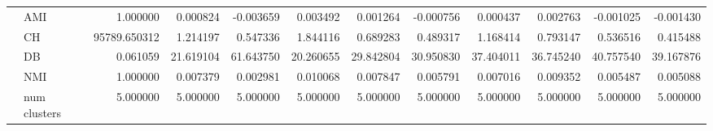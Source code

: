 \begin{tabular}{llrrrrrrrrrr}
 & AMI & 1.000000 & 0.000824 & -0.003659 & 0.003492 & 0.001264 & -0.000756 & 0.000437 & 0.002763 & -0.001025 & -0.001430 \\
 & CH & 95789.650312 & 1.214197 & 0.547336 & 1.844116 & 0.689283 & 0.489317 & 1.168414 & 0.793147 & 0.536516 & 0.415488 \\
 & DB & 0.061059 & 21.619104 & 61.643750 & 20.260655 & 29.842804 & 30.950830 & 37.404011 & 36.745240 & 40.757540 & 39.167876 \\
 & NMI & 1.000000 & 0.007379 & 0.002981 & 0.010068 & 0.007847 & 0.005791 & 0.007016 & 0.009352 & 0.005487 & 0.005088 \\
 & num clusters & 5.000000 & 5.000000 & 5.000000 & 5.000000 & 5.000000 & 5.000000 & 5.000000 & 5.000000 & 5.000000 & 5.000000 \\
\bottomrule
\end{tabular}
